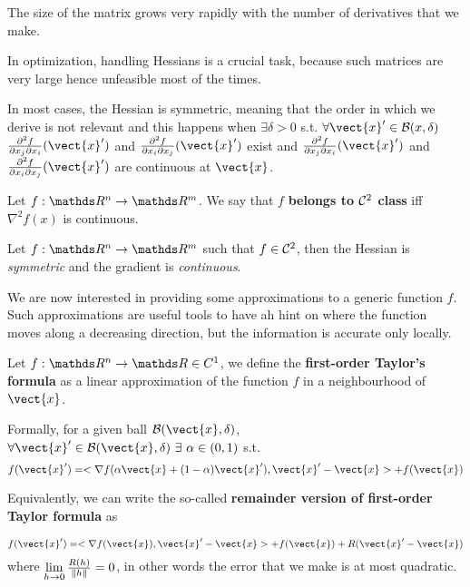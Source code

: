 \documentclass[computationalMathematics.tex]{subfiles}
\begin{document}
\noindent The size of the matrix grows very rapidly with the number of derivatives that we make.

In optimization, handling Hessians is a crucial task, because such matrices are very large hence unfeasible most of the times.

In most cases, the Hessian is symmetric, meaning that the order in which we derive is not relevant and this happens when $\exists \delta > 0$ s.t. $\forall \vect{x}' \in \mathcal{B}(x, \delta)$ $\frac{\partial^2 f}{\partial x_j \partial x_i}(\vect{x}')$ and  $\frac{\partial^2 f}{\partial x_i \partial x_j}(\vect{x}')$ exist and $\frac{\partial^2 f}{\partial x_j \partial x_i}(\vect{x}')$ and  $\frac{\partial^2 f}{\partial x_i \partial x_j}(\vect{x}')$ are continuous at $\vect{x}$.


\begin{definition}[$\C{2}$ functions]
  Let $f: \R^n \to \R^m$. We say that $f$ \textbf{belongs to $\C{2}$ class} iff $\nabla^2 f(x)$ is continuous.
\end{definition}

\begin{property}
Let $f: \R^n \to \R^m$ such that $f \in {\mathcal{C}}^{2}$, then the Hessian is \emph{symmetric} and the gradient is \emph{continuous}.
\end{property}

\noindent We are now interested in providing some approximations to a generic function $f$.
Such approximations are useful tools to have ah hint on where the function moves along a decreasing direction, but the information is accurate only locally.

\begin{definition}
Let $f : \R^n \to \R \in C^1$, we define the \textbf{first-order Taylor's formula} as a linear approximation of the function $f$ in a neighbourhood of $\vect{x}$.

Formally,  for a given ball $\mathcal{B}(\vect{x}, \delta)$, $\forall \vect{x}' \in \mathcal{B}(\vect{x}, \delta)~\exists ~ \alpha \in (0, 1)$ s.t.
\[
  f(\vect{x}') = \ps{\nabla f(\alpha \vect{x}+ (1 - \alpha) \vect{x}')} {\vect{x}' - \vect{x}} + f(\vect{x})
\]

Equivalently, we can write the so-called \textbf{remainder version of first-order Taylor formula} as

\[
  f(\vect{x}') = \ps{\nabla f(\vect{x})}{\vect{x}' - \vect{x}} + f(\vect{x})+ R(\vect{x}' - \vect{x})
\]
  where $\lim\limits_{h \to 0} \frac{R(h)}{\left\lVert h\right\rVert} = 0$, in other words the error that we make is at most quadratic.
\end{definition}
\end{document}
